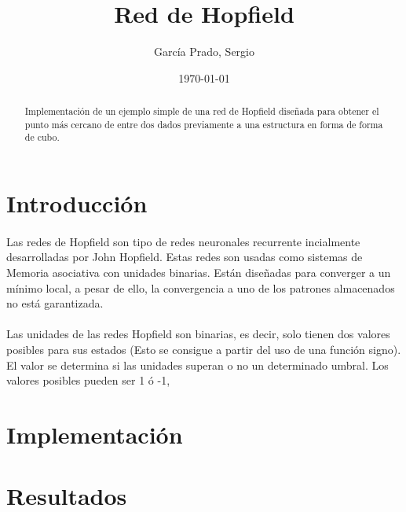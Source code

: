 \documentclass[10pt, a4paper,spanish]{article}
\title{\vspace{-15mm}\fontsize{24pt}{10pt}\selectfont\textbf{Red de Hopfield}}
\author{García Prado, Sergio}
\date{\today}
\begin{document}
	\maketitle

	\thispagestyle{fancy}



	\begin{abstract}
		\noindent Implementación de un ejemplo simple de una red de Hopfield diseñada para obtener el punto más cercano de entre dos dados previamente a una estructura en forma de forma de cubo.
	\end{abstract}



    \section{Introducción}

        \paragraph{}
		Las redes de Hopfield son tipo de redes neuronales recurrente incialmente desarrolladas por John Hopfield. Estas redes son usadas como sistemas de Memoria asociativa con unidades binarias. Están diseñadas para converger a un mínimo local, a pesar de ello, la convergencia a uno de los patrones almacenados no está garantizada.

		\paragraph{}
		Las unidades de las redes Hopfield son binarias, es decir, solo tienen dos valores posibles para sus estados (Esto se consigue a partir del uso de una función signo). El valor se determina si las unidades superan o no un determinado umbral. Los valores posibles pueden ser 1 ó -1,


	\section{Implementación}

		\paragraph{}


	\section{Resultados}

		\paragraph{}
\end{document}
